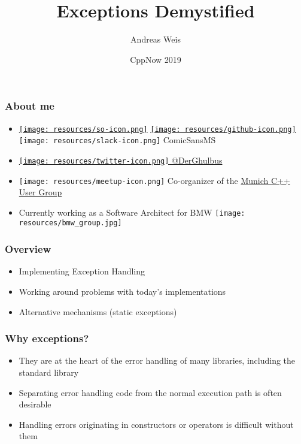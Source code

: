 \documentclass[aspectratio=169]{beamer}
\title{Exceptions Demystified}
\author{Andreas Weis}
\institute{BMW AG}
\date{CppNow 2019}
\newif\iftransitions
\newcommand{\cpause}{\iftransitions \pause \fi}
\begin{document}
\frame{\titlepage}

\iftrue %

\begin{frame}[fragile]
  \frametitle{About me}

  \begin{itemize}
    \setlength\itemsep{1.5em}

    \item \href{https://stackoverflow.com/users/577603/comicsansms}{\texttt{[image: resources/so-icon.png]}} \href{https://github.com/ComicSansMS}{\texttt{[image: resources/github-icon.png]}} \texttt{[image: resources/slack-icon.png]} ComicSansMS

    \item \href{https://twitter.com/DerGhulbus/}{\texttt{[image: resources/twitter-icon.png]} @DerGhulbus}

    \item \texttt{[image: resources/meetup-icon.png]} Co-organizer of the \href{https://www.meetup.com/MUCplusplus/}{Munich C++ User Group}

    \item Currently working as a Software Architect for BMW \texttt{[image: resources/bmw\_group.jpg]}

  \end{itemize}
\end{frame}


\begin{frame}
  \frametitle{Overview}
  \begin{itemize}
  \item Implementing Exception Handling
  \item Working around problems with today's implementations
  \item Alternative mechanisms (static exceptions)
  \end{itemize}
\end{frame}


\begin{frame}
  \frametitle{Why exceptions?}

  \begin{itemize}
    \cpause \item They are at the heart of the error handling of many libraries, including the standard library
    \cpause \item Separating error handling code from the normal execution path is often desirable
    \cpause \item Handling errors originating in constructors or operators is difficult without them
  \end{itemize}
\end{frame}
\end{document}
